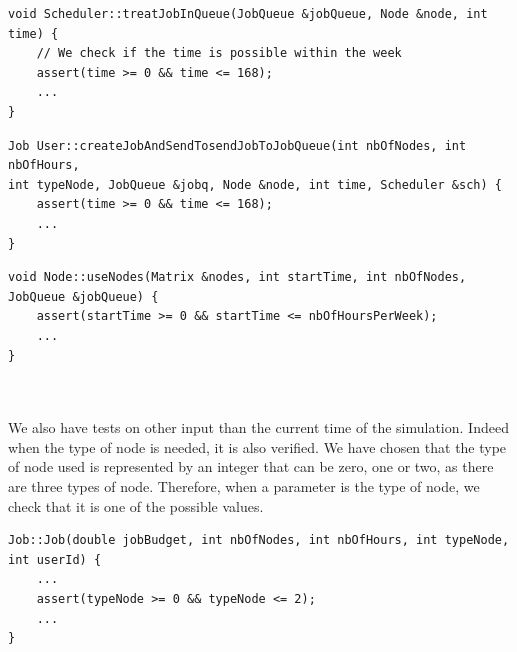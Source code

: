 \documentclass [10 pt, a4 paper]{report}
\begin{document}
\begin{lstlisting}[caption=treatJobInQueue function of the class Scheduler, label={lst:code1}, frame=single]
void Scheduler::treatJobInQueue(JobQueue &jobQueue, Node &node, int time) {
	// We check if the time is possible within the week
	assert(time >= 0 && time <= 168);
	...
}
\end{lstlisting}

\begin{lstlisting}[caption=createJobAndSendTosendJobToJobQueue function of the class User, label={lst:code1}, frame=single]
Job User::createJobAndSendTosendJobToJobQueue(int nbOfNodes, int nbOfHours, 
int typeNode, JobQueue &jobq, Node &node, int time, Scheduler &sch) {
	assert(time >= 0 && time <= 168);
	...
}
\end{lstlisting}

\begin{lstlisting}[caption=useNodes function of the class Node, label={lst:code1}, frame=single]
void Node::useNodes(Matrix &nodes, int startTime, int nbOfNodes, JobQueue &jobQueue) {
	assert(startTime >= 0 && startTime <= nbOfHoursPerWeek);
	...
}
\end{lstlisting}


\noindent
\\ \\
We also have tests on other input than the current time of the simulation. Indeed when the type of node is needed, it is also verified. We have chosen that the type of node used is represented by an integer that can be zero, one or two, as there are three types of node. Therefore, when a parameter is the type of node, we check that it is one of the possible values.

\begin{lstlisting}[caption=Job constructor of the class Job, label={lst:code1}, frame=single]
Job::Job(double jobBudget, int nbOfNodes, int nbOfHours, int typeNode, 
int userId) {
    ...
	assert(typeNode >= 0 && typeNode <= 2);
	...
}
\end{lstlisting}
\end{document}
